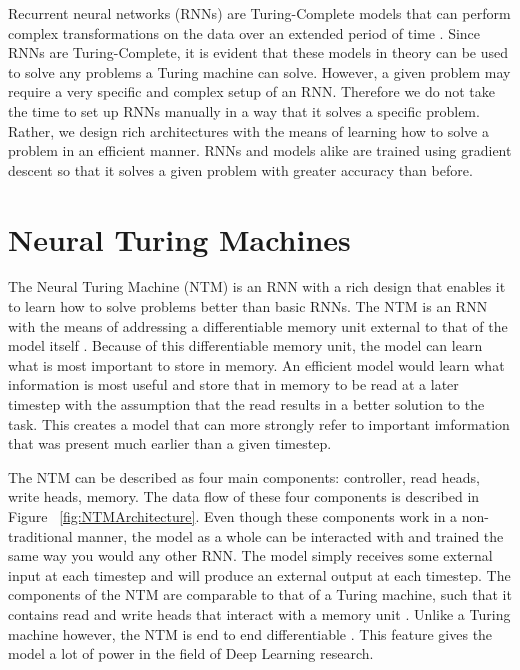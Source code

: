 Recurrent neural networks (RNNs) are Turing-Complete models that can perform
complex transformations on the data over an extended period of time
\cite{siegelmann1995computational}. Since RNNs are Turing-Complete, it is
evident that these models in theory can be used to solve any problems a
Turing machine can solve. However, a given problem may require a very specific
and complex setup of an RNN. Therefore we do not take the time to set up
RNNs manually in a way that it solves a specific problem. Rather, we design
rich architectures with the means of learning how to solve a problem in
an efficient manner. RNNs and models alike are trained using gradient descent
so that it solves a given problem with greater accuracy than before.

\section{Neural Turing Machines}
The Neural Turing Machine (NTM) is an RNN with a rich design that enables it to
learn how to solve problems better than basic RNNs. The NTM is an RNN with the
means of addressing a differentiable memory unit external to that of the model
itself \cite{DBLP:journals/corr/GravesWD14}.
Because of this differentiable memory unit, the model can learn what is most
important to store in memory. An efficient model would learn what information
is most useful and store that in memory to be read at a later timestep with the
assumption that the read results in a better solution to the task.
This creates a model that can more strongly refer to important imformation
that was present much earlier than a given timestep.

The NTM can be described as four main components: controller, read heads,
write heads, memory. The data flow of these four components is described
in Figure ~\ref{fig:NTMArchitecture}. Even though these components work in a
non-traditional manner, the model as a whole can be interacted with and
trained the same way you would any other RNN. The model simply receives
some external input at each timestep and will produce an external output
at each timestep. The components of the NTM are comparable to that of a
Turing machine, such that it contains read and write heads that interact
with a memory unit \cite{DBLP:journals/corr/GravesWD14}. Unlike a Turing
machine however, the NTM is end to end differentiable
\cite{DBLP:journals/corr/GravesWD14}. This feature gives the model a lot of
power in the field of Deep Learning research.

